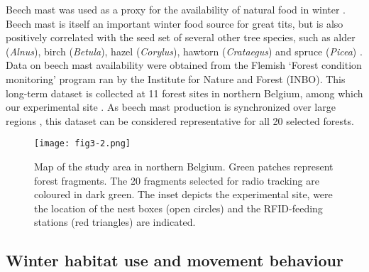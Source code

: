 \documentclass[10pt, twoside]{book} %
\begin{document}
Beech mast was used as a proxy for the availability of natural food in winter \citep{Perdeck2000}. Beech mast is itself an important winter food source for great tits, but is also positively correlated with the seed set of several other tree species, such as alder (\textit{Alnus}), birch (\textit{Betula}), hazel (\textit{Corylus}), hawtorn (\textit{Crataegus}) and spruce (\textit{Picea}) \citep{Perdeck2000, Tinbergen1985}. Data on beech mast availability were obtained from the Flemish `Forest condition monitoring' program ran by the Institute for Nature and Forest (INBO). This long-term dataset is collected at 11 forest sites in northern Belgium, among which our experimental site \citep{Sioen2020}. As beech mast production is synchronized over large regions \citep{Perdeck2000, Chamberlain2007}, this dataset can be considered representative for all 20 selected forests.

	
\begin{figure}[h!]
	\begin{center}
		\texttt{[image: fig3-2.png]}
	\end{center}
	\caption{Map of the study area in northern Belgium. Green patches represent forest fragments. The 20 fragments selected for radio tracking are coloured in dark green. The inset depicts the experimental site, were the location of the nest boxes (open circles) and the RFID-feeding stations (red triangles) are indicated.}\label{fig3-2}
\end{figure}



	\subsection*{Winter habitat use and movement behaviour}
	
\end{document}
